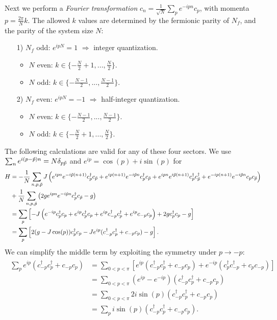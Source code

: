 \noindent Next we perform a \textit{Fourier transformation} $c_n = \frac{1}{\sqrt{N}}\sum_p e^{-ipn}c_p$, with momenta $p = \frac{2 \pi}{N}k$. The allowed $k$ values are determined by the fermionic parity of $N_f$, and the parity of the system size $N$:
\begin{enumerate}
	\item[1)] $N_f$ odd: $e^{ipN} = 1$ $\Rightarrow$ integer quantization.
	\begin{itemize}
		\item $N$ even: $k \in \{- \frac{N}{2}+1, ..., \frac{N}{2}\}$.
		\item $N$ odd: $k \in \{ - \frac{N-1}{2}, ..., \frac{N-1}{2}\}$.
	\end{itemize}
	\item[2)] $N_f$ even: $e^{ipN} = -1$ $\Rightarrow$ half-integer quantization.
	\begin{itemize}
		\item $N$ even: $k \in \{ - \frac{N-1}{2}, ..., \frac{N-1}{2}\}$.
		\item $N$ odd: $k \in \{- \frac{N}{2}+1, ..., \frac{N}{2}\}$.
	\end{itemize}
\end{enumerate}
The following calculations are valid for any of these four sectors. We use $\sum_n e^{i(p-\Tilde{p})n} = N\delta_{p\Tilde{p}}$ and $e^{ip} = \cos(p) + i \sin(p)$ for
\begin{align}
\begin{split}
	H &= -\frac{1}{N} \sum_{n, p, \Tilde{p}} J\left( e^{ipn}e^{-i\Tilde{p}(n+1)}c_p^{\dagger}c_{\Tilde{p}} + e^{ip(n+1)}e^{-i\Tilde{p}n}c_p^{\dagger}c_{\Tilde{p}} + e^{ipn}e^{i\Tilde{p}(n+1)}c_p^{\dagger}c_{\Tilde{p}}^{\dagger}  + e^{-ip(n+1)}e^{-i\Tilde{p}n}c_pc_{\Tilde{p}} \right) \\
	& + \frac{1}{N} \sum_{n, p, \Tilde{p}} \left( 2g e^{ipn}e^{-i\Tilde{p}n}c_p^{\dagger}c_{\Tilde{p}} -g \right) \\
	&= \sum_p \left[-J \left( e^{-ip}c_p^{\dagger}c_p + e^{ip}c_p^{\dagger}c_p + e^{ip}c_{-p}^{\dagger}c_p^{\dagger} + e^{ip}c_{-p}c_p\right) + 2g c_p^{\dagger}c_p - g \right] \\
	&= \sum_p \left[ 2(g - J\cos(p))c_p^{\dagger}c_p - Je^{ip}(c_{-p}^{\dagger}c_p^{\dagger} + c_{-p}c_p) - g\right].
\end{split}
\end{align}
We can simplify the middle term by exploiting the symmetry under $p \rightarrow -p$:
\begin{align}
\begin{split}
	\sum_p e^{ip}(c_{-p}^{\dagger}c_p^{\dagger} + c_{-p}c_p) &= \sum_{0 < p < \pi} \left[ e^{ip}(c_{-p}^{\dagger}c_p^{\dagger} + c_{-p}c_p) + e^{-ip}(c_{p}^{\dagger}c_{-p}^{\dagger} + c_{p}c_{-p})\right] \\
	&= \sum_{0 < p < \pi} (e^{ip} - e^{-ip})(c_{-p}^{\dagger}c_p^{\dagger} + c_{-p}c_p) \\
	&= \sum_{0 < p < \pi} 2i\sin(p)(c_{-p}^{\dagger}c_p^{\dagger} + c_{-p}c_p) \\
	&= \sum_p i\sin(p)(c_{-p}^{\dagger}c_p^{\dagger} + c_{-p}c_p).
\end{split}
\end{align}
